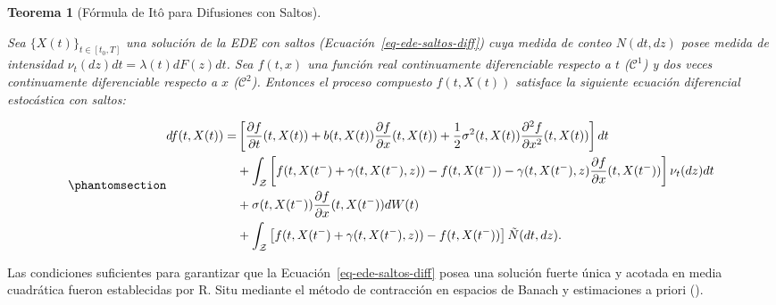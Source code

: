 \documentclass[
  spanish,
  letterpaper,
  DIV=11,
  numbers=noendperiod]{scrreprt}
\theoremstyle{plain}
\theoremstyle{plain}
\newtheorem{theorem}{Teorema}[chapter]
\theoremstyle{plain}
\theoremstyle{definition}
\theoremstyle{remark}
\begin{document}
\begin{theorem}[Fórmula de Itô para Difusiones con
Saltos]\protect\hypertarget{thm-ito-saltos-fijo}{}\label{thm-ito-saltos-fijo}

Sea \(\{X(t)\}_{t \in [t_0, T]}\) una solución de la EDE con saltos
(Ecuación~\ref{eq-ede-saltos-diff}) cuya medida de conteo \(N(dt, dz)\)
posee medida de intensidad \(\nu_t(dz)dt = \lambda(t)dF(z)dt\). Sea
\(f(t, x)\) una función real continuamente diferenciable respecto a
\(t\) (\(\mathcal{C}^1\)) y dos veces continuamente diferenciable
respecto a \(x\) (\(\mathcal{C}^2\)). Entonces el proceso compuesto
\(f(t, X(t))\) satisface la siguiente ecuación diferencial estocástica
con saltos:

\begin{equation}\phantomsection\label{eq-ito-saltos-fijo}{
\begin{aligned}
df(t, X(t)) = & \left[ \frac{\partial f}{\partial t}(t, X(t)) + b(t, X(t))\frac{\partial f}{\partial x}(t, X(t)) + \frac{1}{2}\sigma^2(t, X(t))\frac{\partial^2 f}{\partial x^2}(t, X(t)) \right] dt \\
& + \int_{\mathcal{Z}} \left[ f(t, X(t^-) + \gamma(t, X(t^-), z)) - f(t, X(t^-)) - \gamma(t, X(t^-), z)\frac{\partial f}{\partial x}(t, X(t^-)) \right] \nu_t(dz) dt \\
& + \sigma(t, X(t^-))\frac{\partial f}{\partial x}(t, X(t^-)) dW(t) \\
& + \int_{\mathcal{Z}} \left[ f(t, X(t^-) + \gamma(t, X(t^-), z)) - f(t, X(t^-)) \right] \tilde{N}(dt, dz).
\end{aligned}
}\end{equation}

\end{theorem}

Las condiciones suficientes para garantizar que la
Ecuación~\ref{eq-ede-saltos-diff} posea una solución fuerte única y
acotada en media cuadrática fueron establecidas por R. Situ mediante el
método de contracción en espacios de Banach y estimaciones a priori
().
\end{document}
